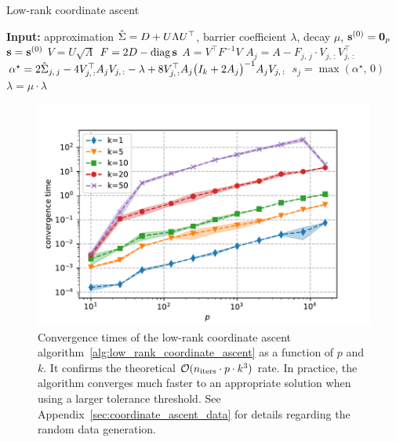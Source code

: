 \begin{algorithm}
    \caption{Low-rank coordinate ascent}\label{alg:low_rank_coordinate_ascent}
    \begin{algorithmic}[1]
        \State \textbf{Input:} approximation $\hat{\Sigma} = D + U \Lambda U^\top$, barrier coefficient $\lambda$,
            decay $\mu$, $\mathbf{s}^{(0)} = \mathbf{0}_p$
        \State $\mathbf{s} = \mathbf{s}^{(0)}$
        \State $V = U \sqrt{\Lambda}$
        \State $F = 2D - \operatorname*{diag}\mathbf{s}$
        \State $A = V^\top F^{-1} V$
        \Repeat
        \State $A_j = A - F_{j,\, j} \cdot V_{j,\, :}V_{j,\, :}^\top$
        \State $\alpha^\star = 2\hat{\Sigma}_{j,\, j} - 4V_{j,\, :}^\top A_j V_{j,\, :} - \lambda + 8V_{j,\, :}^\top A_j \big( I_k + 2A_j \big)^{-1} A_j V_{j,\, :}$
        \State $s_j = \max\left( \alpha^\star,\, 0 \right)$
        \EndFor
        \State $\lambda = \mu \cdot \lambda$
    \end{algorithmic}
\end{algorithm}
\begin{figure}
    \centering
    \includegraphics[width=0.8\linewidth, height=0.5\linewidth]{figures/low_rank_times.pdf}
    \caption{
        Convergence times of the low-rank coordinate ascent algorithm~\ref{alg:low_rank_coordinate_ascent}
        as a function of $p$ and $k$.
        It confirms the theoretical $\mathcal{O}(n_{\text{iters}} \cdot p \cdot k^3)$ rate.
        In practice,
        the algorithm converges much faster to an appropriate solution when using a larger tolerance threshold.
        See Appendix~\ref{sec:coordinate_ascent_data} for details regarding the random data generation.
    }
    \label{fig:low_rank_times}
\end{figure}

